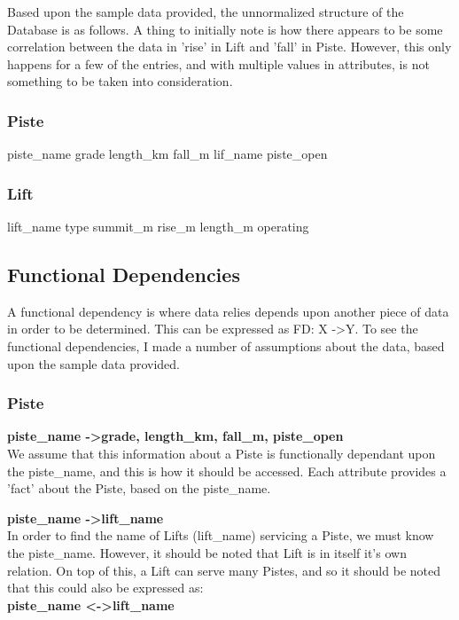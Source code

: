 \documentclass[11pt]{scrartcl} %
\begin{document}
Based upon the sample data provided\cite{sample}, the unnormalized structure of the Database is as follows. A thing to initially note is how there appears to be some correlation between the data in 'rise' in Lift and 'fall' in Piste. However, this only happens for a few of the entries, and with multiple values in attributes, is not something to be taken into consideration.

\subsubsection{Piste}
piste\_name\newline
grade\newline
length\_km\newline
fall\_m\newline
lif\_name\newline
piste\_open

\subsubsection{Lift}
lift\_name\newline
type\newline
summit\_m\newline
rise\_m\newline
length\_m\newline
operating

\subsection{Functional Dependencies}
A functional dependency is where data relies depends upon another piece of data in order to be determined. This can be expressed as FD: X -\textgreater \space Y. To see the functional dependencies, I made a number of assumptions about the data, based upon the sample data provided.
\subsubsection{Piste}
 \textbf{piste\_name -\textgreater  grade, length\_km, fall\_m, piste\_open}
\\[0.1cm]
We assume that this information about a Piste is functionally dependant upon the piste\_name, and this is how it should be accessed. Each attribute provides a 'fact' about the Piste, based on the piste\_name.

\textbf{piste\_name -\textgreater lift\_name}
\\[0.1cm]
In order to find the name of Lifts (lift\_name) servicing a Piste, we must know the piste\_name. However, it should be noted that Lift is in itself it's own relation. On top of this, a Lift can serve many Pistes, and so it should be noted that this could also be expressed as:\\[0.1cm]
\textbf{piste\_name \textless -\textgreater \space lift\_name}
\end{document}
